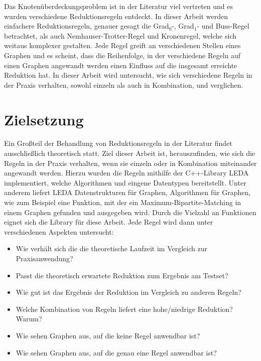 Das Knotenüberdeckungsproblem ist in der Literatur viel vertreten und es wurden verschiedene Reduktionsregeln entdeckt. In dieser Arbeit werden einfachere Reduktionsregeln, genauer gesagt die Grad$_{0}$-, Grad$_{1}$- und Buss-Regel betrachtet, als auch Nemhauser-Trotter-Regel und Kronenregel, welche sich weitaus komplexer gestalten. Jede Regel greift an verschiedenen Stellen eines Graphen und es scheint, dass die Reihenfolge, in der verschiedene Regeln auf einen Graphen angewandt werden einen Einfluss auf die insgesamt erreichte Reduktion hat. In dieser Arbeit wird untersucht, wie sich verschiedene Regeln in der Praxis verhalten, sowohl einzeln als auch in Kombination, und verglichen. 

\section{Zielsetzung}
\label{ch:Einleitung:sec:Zielsetzung}

Ein Großteil der Behandlung von Reduktionsregeln in der Literatur findet ausschließlich theoretisch statt.
Ziel dieser Arbeit ist, herauszufinden, wie sich die Regeln in der Praxis verhalten, wenn sie einzeln oder in Kombination miteinander angewandt werden. Hierzu wurden die Regeln mithilfe der C++-Library LEDA \cite{manual} implementiert, welche Algorithmen und eingene Datentypen bereitstellt. Unter anderem liefert LEDA Datenstrukturen für Graphen, Algorithmen für Graphen, wie zum Beispiel eine Funktion, mit der ein Maximum-Bipartite-Matching in einem Graphen gefunden und ausgegeben wird. Durch die Vielzahl an Funktionen eignet sich die Library für diese Arbeit. Jede Regel wird dann unter verschiedenen Aspekten untersucht:
\begin{itemize}
\item Wie verhält sich die die theoretische Laufzeit im Vergleich zur Praxisanwendung?
\item Passt die theoretisch erwartete Reduktion zum Ergebnis am Testset?
\item Wie gut ist das Ergebnis der Reduktion im Vergleich zu anderen Regeln?
\item Welche Kombination von Regeln liefert eine hohe/niedrige Reduktion? Warum?
\item Wie sehen Graphen aus, auf die keine Regel anwendbar ist?
\item Wie sehen Graphen aus, auf die genau eine Regel anwendbar ist?
\end{itemize}


